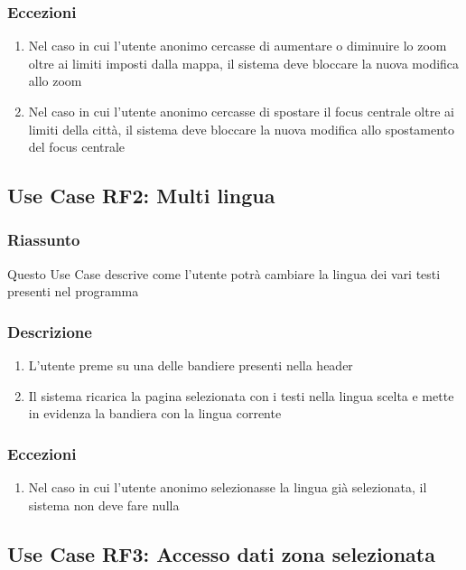         \subsubsection{Eccezioni}
            \begin{enumerate}
                \item Nel caso in cui l'utente anonimo cercasse di aumentare o diminuire lo zoom oltre ai limiti imposti dalla mappa, il sistema deve bloccare la nuova modifica allo zoom
                \item Nel caso in cui l'utente anonimo cercasse di spostare il focus centrale oltre ai limiti della città, il sistema deve bloccare la nuova modifica allo spostamento del focus centrale
            \end{enumerate}
            
    \subsection{Use Case RF2: Multi lingua}
        \subsubsection{Riassunto}
            Questo Use Case descrive come l'utente potrà cambiare la lingua dei vari testi presenti nel programma
        \subsubsection{Descrizione}
            \begin{enumerate}
                \item L'utente preme su una delle bandiere presenti nella header
                \item Il sistema ricarica la pagina selezionata con i testi nella lingua scelta e mette in evidenza la bandiera con la lingua corrente
            \end{enumerate}
        \subsubsection{Eccezioni}
            \begin{enumerate}
                \item Nel caso in cui l'utente anonimo selezionasse la lingua già selezionata, il sistema non deve fare nulla
            \end{enumerate}

    \subsection{Use Case RF3: Accesso dati zona selezionata}

